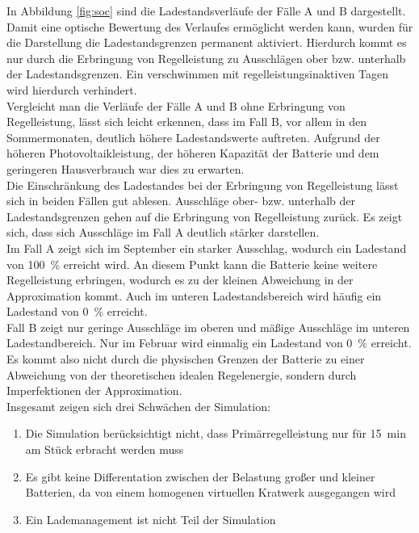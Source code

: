 \noindent In Abbildung \ref{fig:soc} sind die Ladestandsverläufe der Fälle A und B dargestellt. Damit eine optische Bewertung des Verlaufes ermöglicht werden kann, wurden für die Darstellung die Ladestandsgrenzen permanent aktiviert. Hierdurch kommt es nur durch die Erbringung von Regelleistung zu Ausschlägen ober bzw. unterhalb der Ladestandsgrenzen. Ein verschwimmen mit regelleistungsinaktiven Tagen wird hierdurch verhindert.\medskip\\
Vergleicht man die Verläufe der Fälle A und B ohne Erbringung von Regelleistung, lässt sich leicht erkennen, dass im Fall B, vor allem in den Sommermonaten, deutlich höhere Ladestandswerte auftreten. Aufgrund der höheren Photovoltaikleistung, der höheren Kapazität der Batterie und dem geringeren Hausverbrauch war dies zu erwarten.\medskip\\
Die Einschränkung des Ladestandes bei der Erbringung von Regelleistung lässt sich in beiden Fällen gut ablesen. Ausschläge ober- bzw. unterhalb der Ladestandsgrenzen gehen auf die Erbringung von Regelleistung zurück. Es zeigt sich, dass sich Ausschläge im Fall A deutlich stärker darstellen.\medskip\\
Im Fall A zeigt sich im September ein starker Ausschlag, wodurch ein Ladestand von \SI{100}{\percent} erreicht wird. An diesem Punkt kann die Batterie keine weitere Regelleistung erbringen, wodurch es zu der kleinen Abweichung in der Approximation kommt. Auch im unteren Ladestandsbereich wird häufig ein Ladestand von \SI{0}{\percent} erreicht.\medskip\\
Fall B zeigt nur geringe Ausschläge im oberen und mäßige Ausschläge im unteren Ladestandbereich. Nur im Februar wird einmalig ein Ladestand von \SI{0}{\percent} erreicht. Es kommt also nicht durch die physischen Grenzen der Batterie zu einer Abweichung von der theoretischen idealen Regelenergie, sondern durch Imperfektionen der Approximation.\medskip\\
Insgesamt zeigen sich drei Schwächen der Simulation:

\begin{enumerate}
\itemsep-0.5em
	\item Die Simulation berücksichtigt nicht, dass Primärregelleistung nur für \SI{15}{\minute} am Stück erbracht werden muss
	\item Es gibt keine Differentation zwischen der Belastung großer und kleiner Batterien, da von einem homogenen virtuellen Kratwerk ausgegangen wird
	\item Ein Lademanagement ist nicht Teil der Simulation
\end{enumerate}

\newpage
